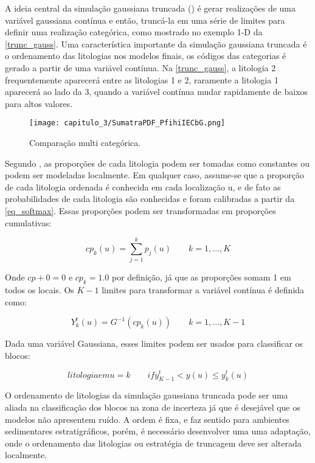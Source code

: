 A ideia central da simulação gaussiana truncada (\cite{matheron1987conditional}) é gerar realizações de uma variável gaussiana contínua e então, truncá-la em uma série de limites para definir uma realização categórica, como mostrado no exemplo 1-D da \autoref{trunc_gauss}. Uma característica importante da simulação gaussiana truncada é o ordenamento das litologias nos modelos finais, os códigos das categorias é gerado a partir de uma variável contínua. Na \autoref{trunc_gauss}, a litologia 2 frequentemente aparecerá entre as litologias 1 e 2, raramente a litologia 1 aparecerá ao lado da 3, quando a variável contínua mudar rapidamente de baixos para altos valores.

\begin{figure}[!ht]
	\caption{\label{trunc_gauss}Comparação multi categórica.}
	\begin{center}
		\texttt{[image: capitulo\_3/SumatraPDF\_PfihiIECbG.png]}
	\end{center}
\end{figure}

Segundo , as proporções de cada litologia podem ser tomadas como constantes ou podem ser modeladas localmente. Em qualquer caso, assume-se que a proporção de cada litologia ordenada é conhecida em cada localização u, e de fato as probabilidades de cada litologia são conhecidas e foram calibradas a partir da \autoref{eq_softmax}. Essas proporções podem ser transformadas em proporções cumulativas:

\begin{equation}
    cp_k(u)=\sum_{j=1}^kp_j(u) \qquad k=1,...,K
\end{equation}

Onde $cp+0=0$ e $cp_k=1.0$ por definição, já que as proporções somam 1 em todos os locais. Os $K-1$ limites para transformar a variável contínua é definida como:

\begin{equation}
    Y_k^t(u)=G^{-1}(cp_k(u)) \qquad k=1,...,K-1
\end{equation}

Dada uma variável Gaussiana, esses limites podem ser usados para classificar os blocos:

\begin{equation}
    litologia em u = k \qquad ify_{K-1}^t<y(u)\leq y_{k}^t(u)
\end{equation}

O ordenamento de litologias da simulação gaussiana truncada pode ser uma aliada na classificação dos blocos na zona de incerteza já que é desejável que os modelos não apresentem ruído. A ordem é fixa, e faz sentido para ambientes sedimentares estratigráficos, porém, é necessário desenvolver uma uma adaptação, onde o ordenamento das litologias ou estratégia de truncagem deve ser alterada localmente.  

